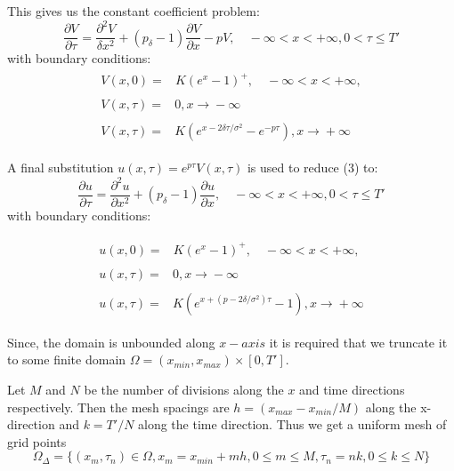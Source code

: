 \documentclass[11pt]{article}
\begin{document}
This gives us the constant coefficient problem:
\begin{equation}
    \frac{\partial V}{\partial \tau} = \frac{\partial^{2} V}{\delta x^{2}} + (p_{\delta}-1)\frac{\partial V}{\partial x}-pV, \quad -\infty < x< +\infty, 0 < \tau \le T'
\end{equation}
with boundary conditions:
\begin{align*}
    \begin{split}
        V(x,0) ={}& K(e^{x}-1)^{+}, \quad -\infty <x < +\infty,
    \end{split}\\
    \begin{split}
        V(x,\tau) ={}& 0, x \xrightarrow{} -\infty
    \end{split}\\
    \begin{split}
        V(x,\tau) ={}& K(e^{x-2\delta\tau/\sigma^{2}}-e^{-p\tau}), x \xrightarrow{} +\infty
    \end{split}
\end{align*}

A final substitution $u(x, \tau)=e^{p\tau}V(x, \tau)$ is used to reduce (3) to:
\begin{equation}
    \frac{\partial u}{\partial \tau} = \frac{\partial^{2} u}{\partial x^{2}} + (p_{\delta}-1)\frac{\partial u}{\partial x}, \quad -\infty < x< +\infty, 0 < \tau \le T'
\end{equation}
with boundary conditions:

\begin{align*}
    \begin{split}
        u(x,0) ={}& K(e^{x}-1)^{+}, \quad -\infty <x < +\infty,
    \end{split}\\
    \begin{split}
        u(x,\tau) ={}& 0, x \xrightarrow{} -\infty
    \end{split}\\
    \begin{split}
        u(x,\tau) ={}& K(e^{x+(p-2\delta/\sigma^{2})\tau}-1), x \xrightarrow{} +\infty
    \end{split}
\end{align*}

Since, the domain is unbounded along $x-axis$ it is required that we truncate it to some finite domain $\Omega = (x_{min}, x_{max})\times [0, T']$.

Let $M$ and $N$ be the number of divisions along the $x$ and time directions respectively. Then the mesh spacings are $h=(x_{max}-x_{min}/M)$ along the x-direction and $k=T'/N$ along the time direction. Thus we get a uniform mesh of grid points
\begin{equation*}
    \Omega_{\Delta} = \{(x_{m},\tau_{n}) \in \Omega, x_{m}=x_{min}+mh, 0\le m \le M, \tau_{n}=nk, 0\le k \le N\}
\end{equation*}
\end{document}
